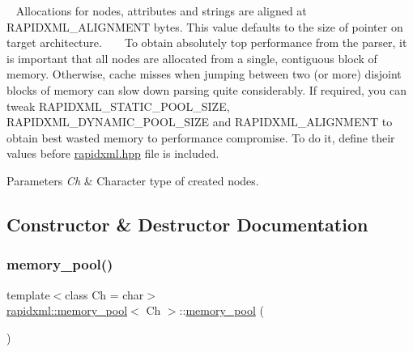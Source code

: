 ~\newline
 Allocations for nodes, attributes and strings are aligned at {\ttfamily R\+A\+P\+I\+D\+X\+M\+L\+\_\+\+A\+L\+I\+G\+N\+M\+E\+NT} bytes. This value defaults to the size of pointer on target architecture. ~\newline
~\newline
 To obtain absolutely top performance from the parser, it is important that all nodes are allocated from a single, contiguous block of memory. Otherwise, cache misses when jumping between two (or more) disjoint blocks of memory can slow down parsing quite considerably. If required, you can tweak {\ttfamily R\+A\+P\+I\+D\+X\+M\+L\+\_\+\+S\+T\+A\+T\+I\+C\+\_\+\+P\+O\+O\+L\+\_\+\+S\+I\+ZE}, {\ttfamily R\+A\+P\+I\+D\+X\+M\+L\+\_\+\+D\+Y\+N\+A\+M\+I\+C\+\_\+\+P\+O\+O\+L\+\_\+\+S\+I\+ZE} and {\ttfamily R\+A\+P\+I\+D\+X\+M\+L\+\_\+\+A\+L\+I\+G\+N\+M\+E\+NT} to obtain best wasted memory to performance compromise. To do it, define their values before \mbox{\hyperlink{rapidxml_8hpp}{rapidxml.\+hpp}} file is included. 
\begin{DoxyParams}{Parameters}
{\em Ch} & Character type of created nodes. \\
\hline
\end{DoxyParams}


\subsection{Constructor \& Destructor Documentation}
\mbox{\label{classrapidxml_1_1memory__pool_a0b609da81dff28a19ebd704400788429}} 
\subsubsection{\texorpdfstring{memory\_pool()}{memory\_pool()}}
{\footnotesize\ttfamily template$<$class Ch  = char$>$ \\
\mbox{\hyperlink{classrapidxml_1_1memory__pool}{rapidxml\+::memory\+\_\+pool}}$<$ Ch $>$\+::\mbox{\hyperlink{classrapidxml_1_1memory__pool}{memory\+\_\+pool}} (\begin{DoxyParamCaption}{ }\end{DoxyParamCaption})\hspace{0.3cm}{\ttfamily [inline]}}



